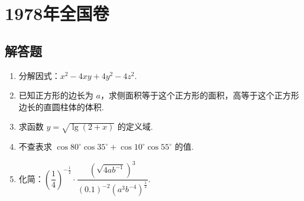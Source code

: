\chapter{1978年全国卷}

\section{解答题}

\begin{problem}
\begin{enumerate}
\item 分解因式：\(x^{2}-4xy+4y^{2}-4z^{2}\).
\item 已知正方形的边长为 \(a\)，求侧面积等于这个正方形的面积，高等于这个正方形边长的直圆柱体的体积.
\item 求函数 \(y=\sqrt{\lg(2+x)}\) 的定义域.
\item 不查表求 \(\cos80^{\circ}\cos35^{\circ}+\cos10^{\circ}\cos55^{\circ}\) 的值.
\item 化简：\(\left(\dfrac{1}{4}\right)^{-\frac{1}{2}}\cdot\dfrac{\left(\sqrt{4ab^{-1}}\right)^{3}}{(0.1)^{-2}\left(a^{3}b^{-4}\right)^{\frac{1}{2}}}\).
\end{enumerate}
\end{problem}

